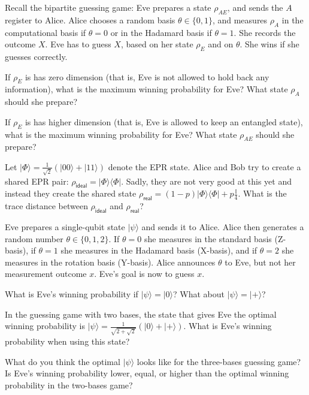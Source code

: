 \documentclass[a4paper,10pt,landscape,twocolumn]{scrartcl}
\newcommand{\ket}[1]{\lvert #1 \rangle}
\newcommand{\bra}[1]{\langle #1 \rvert}
\newcommand{\id}{\mathbb{I}}
\begin{document}
\begin{exercise}
Recall the bipartite guessing game: Eve prepares a state $\rho_{AE}$, and sends the $A$ register to Alice. Alice chooses a random basis $\theta \in \{0,1\}$, and measures $\rho_A$ in the computational basis if $\theta = 0$ or in the Hadamard basis if $\theta = 1$. She records the outcome $X$. Eve has to guess $X$, based on her state $\rho_E$ and on $\theta$. She wins if she guesses correctly.

\begin{subex}
If $\rho_E$ is has zero dimension (that is, Eve is not allowed to hold back any information), what is the maximum winning probability for Eve? What state $\rho_A$ should she prepare?
\end{subex}

\begin{subex}
If $\rho_E$ is has higher dimension (that is, Eve is allowed to keep an entangled state), what is the maximum winning probability for Eve? What state $\rho_{AE}$ should she prepare?
\end{subex}
\end{exercise}

\begin{exercise}
	Let $\ket{\Phi} = \frac{1}{\sqrt{2}}(\ket{00} + \ket{11})$ denote the EPR state. Alice and Bob try to create a shared EPR pair: $\rho_{\mathsf{ideal}} = \ket{\Phi}\bra{\Phi}$. Sadly, they are not very good at this yet and instead they create the shared state $\rho_{\mathsf{real}} = (1-p)\ket{\Phi}\bra{\Phi} + p \frac{\id}{4}$. What is the trace distance between $\rho_{\mathsf{ideal}}$ and $\rho_{\mathsf{real}}$?
\end{exercise}


\begin{exercise}
	Eve prepares a single-qubit state $\ket{\psi}$ and sends it to Alice. Alice then generates a random number $\theta \in \{0,1,2\}$. If $\theta = 0$ she measures in the standard basis (Z-basis), if $\theta = 1$ she measures in the Hadamard basis (X-basis), and if $\theta = 2$ she measures in the rotation basis (Y-basis). Alice announces $\theta$ to Eve, but not her measurement outcome $x$. Eve's goal is now to guess $x$.
	\begin{subex}
		What is Eve's winning probability if $\ket{\psi} = \ket0$? What about $\ket{\psi} = \ket{+}$?
	\end{subex}
	\begin{subex}
		In the guessing game with two bases, the state that gives Eve the optimal winning probability is $\ket{\psi} = \frac{1}{\sqrt{2 + \sqrt{2}}} (\ket0 + \ket{+})$. What is Eve's winning probability when using this state?
	\end{subex}
\begin{subex}
	What do you think the optimal $\ket{\psi}$ looks like for the three-bases guessing game? Is Eve's winning probability lower, equal, or higher than the optimal winning probability in the two-bases game?
\end{subex}
\end{exercise}
\end{document}
